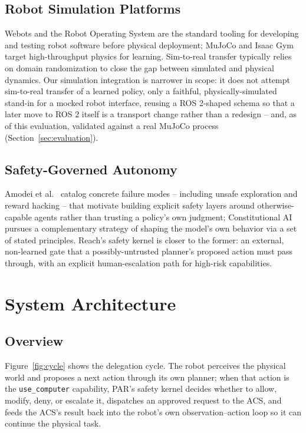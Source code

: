 \documentclass[conference]{IEEEtran}
\begin{document}
\subsection{Robot Simulation Platforms}
Webots \cite{michel2004webots} and the Robot Operating System \cite{quigley2009ros} are the standard tooling for developing and testing robot
software before physical deployment; MuJoCo \cite{todorov2012mujoco} and Isaac Gym \cite{makoviychuk2021isaacgym} target high-throughput physics for
learning. Sim-to-real transfer typically relies on domain randomization \cite{tobin2017domain,peng2018simtoreal} to close the gap between
simulated and physical dynamics. Our simulation integration is narrower in scope: it does not attempt
sim-to-real transfer of a learned policy, only a faithful, physically-simulated stand-in for a mocked robot
interface, reusing a ROS 2-shaped schema so that a later move to ROS 2 itself is a transport change rather
than a redesign -- and, as of this evaluation, validated against a real MuJoCo process (Section~\ref{sec:evaluation}).

\subsection{Safety-Governed Autonomy}
Amodei et al.\ \cite{amodei2016concrete} catalog concrete failure modes -- including unsafe exploration and reward hacking -- that
motivate building explicit safety layers around otherwise-capable agents rather than trusting a policy's own
judgment; Constitutional AI \cite{bai2022constitutional} pursues a complementary strategy of shaping the model's own behavior via
a set of stated principles. Reach's safety kernel is closer to the former: an external, non-learned gate that a
possibly-untrusted planner's proposed action must pass through, with an explicit human-escalation path for
high-risk capabilities.

\section{System Architecture}
\subsection{Overview}
Figure~\ref{fig:cycle} shows the delegation cycle. The robot perceives the physical world and proposes a next action
through its own planner; when that action is the \texttt{use\_computer} capability, PAR's safety kernel decides
whether to allow, modify, deny, or escalate it, dispatches an approved request to the ACS, and feeds the
ACS's result back into the robot's own observation--action loop so it can continue the physical task.
\end{document}
